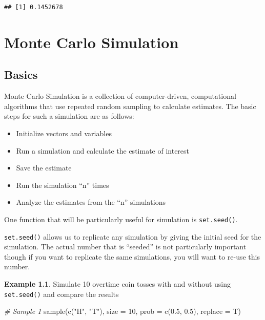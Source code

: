 \documentclass[
  11pt,
]{book}
\newenvironment{Shaded}{\begin{snugshade}}{\end{snugshade}}
\newcommand{\AttributeTok}[1]{\textcolor[rgb]{0.77,0.63,0.00}{#1}}
\newcommand{\CommentTok}[1]{\textcolor[rgb]{0.56,0.35,0.01}{\textit{#1}}}
\newcommand{\DecValTok}[1]{\textcolor[rgb]{0.00,0.00,0.81}{#1}}
\newcommand{\FloatTok}[1]{\textcolor[rgb]{0.00,0.00,0.81}{#1}}
\newcommand{\FunctionTok}[1]{\textcolor[rgb]{0.00,0.00,0.00}{#1}}
\newcommand{\NormalTok}[1]{#1}
\newcommand{\StringTok}[1]{\textcolor[rgb]{0.31,0.60,0.02}{#1}}
\theoremstyle{definition}
\theoremstyle{definition}
\newtheorem{example}{Example}[chapter]
\theoremstyle{definition}
\theoremstyle{definition}
\theoremstyle{remark}
\begin{document}
\begin{verbatim}
## [1] 0.1452678
\end{verbatim}

\hypertarget{monte-carlo-simulation}{%
\chapter{Monte Carlo Simulation}\label{monte-carlo-simulation}}

\hypertarget{basics}{%
\section{Basics}\label{basics}}

Monte Carlo Simulation is a collection of computer-driven, computational algorithms that use repeated random sampling to calculate estimates. The basic steps for such a simulation are as follows:

\begin{itemize}
\item
  Initialize vectors and variables
\item
  Run a simulation and calculate the estimate of interest
\item
  Save the estimate
\item
  Run the simulation ``n'' times
\item
  Analyze the estimates from the ``n'' simulations\\
\end{itemize}

One function that will be particularly useful for simulation is \texttt{set.seed()}.

\texttt{set.seed()} allows us to replicate any simulation by giving the initial seed for the simulation. The actual number that is ``seeded'' is not particularly important though if you want to replicate the same simulations, you will want to re-use this number.

\newpage

\begin{example}
Simulate 10 overtime coin tosses with and without using \texttt{set.seed()} and compare the results
\end{example}

\begin{Shaded}
\begin{Highlighting}[]
\CommentTok{\# Sample 1}
\FunctionTok{sample}\NormalTok{(}\FunctionTok{c}\NormalTok{(}\StringTok{"H"}\NormalTok{, }\StringTok{"T"}\NormalTok{), }\AttributeTok{size =} \DecValTok{10}\NormalTok{, }\AttributeTok{prob =} \FunctionTok{c}\NormalTok{(}\FloatTok{0.5}\NormalTok{, }\FloatTok{0.5}\NormalTok{), }\AttributeTok{replace =}\NormalTok{ T)}
\end{Highlighting}
\end{Shaded}
\end{document}
